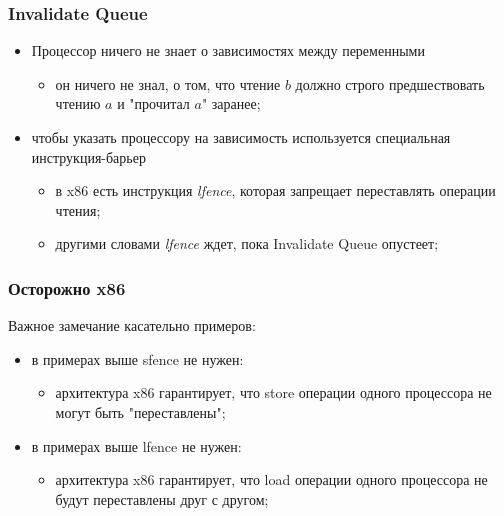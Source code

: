 \begin{frame}
\frametitle{Invalidate Queue}

\begin{itemize}
  \item Процессор ничего не знает о зависимостях между переменными
        \begin{itemize}
          \item он ничего не знал, о том, что чтение $b$ должно строго
                предшествовать чтению $a$ и "прочитал $a$" заранее;
        \end{itemize}
  \item чтобы указать процессору на зависимость используется специальная
        инструкция-барьер
        \begin{itemize}
          \item в x86 есть инструкция \emph{lfence}, которая запрещает
                переставлять операции чтения;
          \item другими словами \emph{lfence} ждет, пока Invalidate Queue
                опустеет;
        \end{itemize}
\end{itemize}
\end{frame}

\begin{frame}
\frametitle{Осторожно x86}

Важное замечание касательно примеров:
\begin{itemize}
  \item в примерах выше sfence не нужен:
        \begin{itemize}
          \item архитектура x86 гарантирует, что store операции одного
                процессора не могут быть "переставлены";
        \end{itemize}
  \item в примерах выше lfence не нужен:
        \begin{itemize}
          \item архитектура x86 гарантирует, что load операции одного
                процессора не будут переставлены друг с другом;
        \end{itemize}
\end{itemize}
\end{frame}
